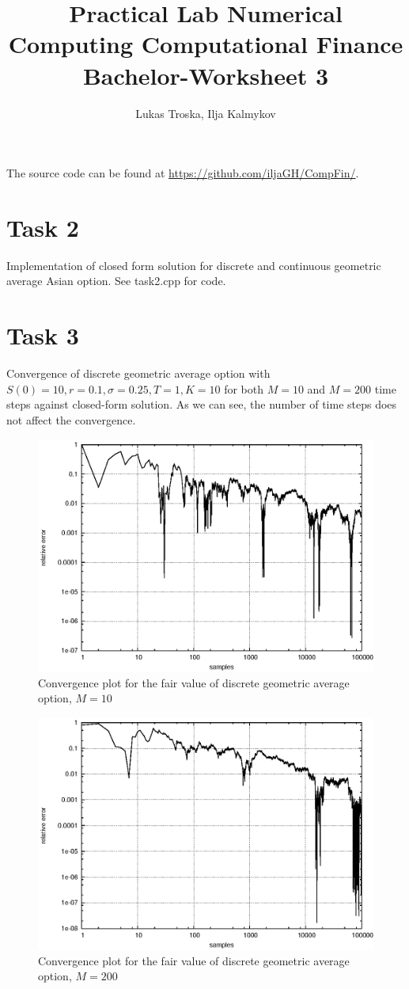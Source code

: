 \documentclass[]{article}
\title{Practical Lab Numerical Computing Computational Finance \\Bachelor-Worksheet 3}
\author{Lukas Troska, Ilja Kalmykov}
\date{}
\begin{document}
\maketitle

The source code can be found at \url{https://github.com/iljaGH/CompFin/}.

\section*{Task 2}
Implementation of closed form solution for discrete and continuous geometric average Asian option. See task2.cpp for code.

\section*{Task 3}
Convergence of discrete geometric average option with $S(0)=10,r=0.1,\sigma=0.25,T=1,K=10$ for both $M=10$ and $M=200$ time steps against closed-form solution.
As we can see, the number of time steps does not affect the convergence.
\begin{figure}[!ht]
\centering
\includegraphics[width=.9\textwidth]{task3_10.eps}
\caption{Convergence plot for the fair value of discrete geometric average
option, $M = 10$}
\label{fig:Task3a}
\end{figure}
\begin{figure}[!ht]
\centering
\includegraphics[width=.9\textwidth]{task3_200.eps}
\caption{Convergence plot for the fair value of discrete geometric average
option, $M = 200$}
\label{fig:Task3b}
\end{figure}
\clearpage
\end{document}
